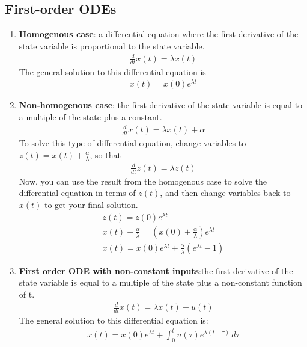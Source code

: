 \subsection*{First-order ODEs}
\begin{enumerate}
    \item \textbf{Homogenous case}: a differential equation where the first derivative of the state variable is proportional to the state variable.
    \begin{align*}
        \frac{d}{dt} x(t) = \lambda x(t)
    \end{align*}
    The general solution to this differential equation is
    \begin{align*}
        x(t) = x(0) e^{\lambda t}
    \end{align*}

    \item \textbf{Non-homogenous case}: the first derivative of the state variable is equal to a multiple of the state plus a constant.
    \begin{align*}
        \frac{d}{dt} x(t) = \lambda x(t) + \alpha
    \end{align*}
    To solve this type of differential equation, change variables to $z(t) = x(t) + \frac{\alpha}{\lambda}$, so that
    \begin{align*}
        \frac{d}{dt} z(t) = \lambda z(t)
    \end{align*}
    Now, you can use the result from the homogenous case to solve the differential equation in terms of $z(t)$, and then change variables back to $x(t)$ to get your final solution.
    \begin{align*}
        z(t) = z(0) e^{\lambda t} \\
        x(t) + \frac{\alpha}{\lambda} = (x(0) + \frac{\alpha}{\lambda}) e^{\lambda t} \\
        x(t) = x(0) e^{\lambda t} + \frac{\alpha}{\lambda}(e^{\lambda t} - 1)
    \end{align*}

    \item \textbf{First order ODE with non-constant inputs}:the first derivative of the state variable is equal to a multiple of the state plus a non-constant function of t.
    \begin{align*}
        \frac{d}{dt} x(t) = \lambda x(t) + u(t)
    \end{align*}
    The general solution to this differential equation is:
    \begin{align*}
        x(t) = x(0) e^{\lambda t} + \int_0^t u(\tau) e^{\lambda(t - \tau)} \, d\tau
    \end{align*}

\end{enumerate}
\newpage 
